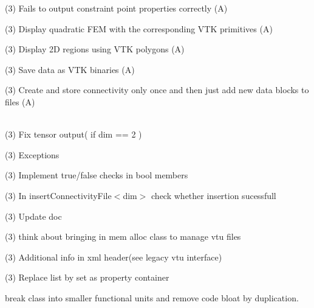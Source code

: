 \begin{DoxyRefList}
(3) Fails to output constraint point properties correctly (A) 



(3) Display quadratic FEM with the corresponding VTK primitives (A) 



(3) Display 2D regions using VTK polygons (A) 



(3) Save data as VTK binaries (A) 



(3) Create and store connectivity only once and then just add new data blocks to files (A)  
\item[Class \doxylink{classcsmp_1_1_v_t_u___interface}{csmp\+::VTU\+\_\+\+Interface\texorpdfstring{$<$}{<} dim \texorpdfstring{$>$}{>}} ]\hfill \\
\label{todo__todo000006}%
%
(3) Fix tensor output( if dim == 2 ) 



(3) Exceptions 



(3) Implement true/false checks in bool members 



(3) In insert\+Connectivity\+File$<$dim$>$ check whether insertion sucessfull 



(3) Update doc 



(3) think about bringing in mem alloc class to manage vtu files 



(3) Additional info in xml header(see legacy vtu interface) 



(3) Replace list by set as property container 

\label{todo__todo000007}%
%
break class into smaller functional units and remove code bloat by duplication. 




\end{DoxyRefList}
